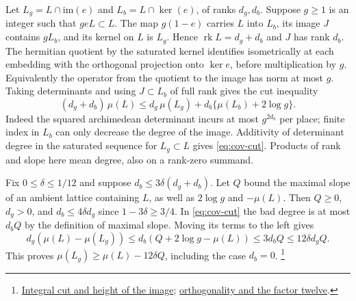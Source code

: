 Let \(L_g=L\cap\mathrm{im}(e)\) and \(L_b=L\cap\ker(e)\), of ranks
\(d_g,d_b\). Suppose \(g\ge1\) is an integer such that \(geL\subset L\).
The map \(g(1-e)\) carries \(L\) into \(L_b\), its image \(J\)
contains \(gL_b\), and its kernel on \(L\) is \(L_g\). Hence
\(\operatorname{rk}L=d_g+d_b\) and \(J\) has rank \(d_b\).
The hermitian quotient by the saturated kernel identifies isometrically
at each embedding with the orthogonal projection onto \(\ker e\),
before multiplication by \(g\). Equivalently the operator from the
quotient to the image has norm at most \(g\). Taking determinants and
using \(J\subset L_b\) of full rank gives the cut inequality
\begin{equation}
 (d_g+d_b)\,\mu(L)\le d_g\,\mu(L_g)+d_b\{\mu(L_b)+2\log g\}.
 \label{eq:cov-cut}
\end{equation}
Indeed the squared archimedean determinant incurs at most \(g^{2d_b}\)
per place; finite index in \(L_b\) can only decrease the degree of
the image. Additivity of determinant degree in the saturated sequence
for \(L_g\subset L\) gives \eqref{eq:cov-cut}. Products of rank and
slope here mean degree, also on a rank-zero summand.

Fix \(0\le\delta\le1/12\) and suppose \(d_b\le3\delta(d_g+d_b)\).
Let \(Q\) bound the maximal slope of an ambient lattice containing \(L\),
as well as \(2\log g\) and \(-\mu(L)\). Then \(Q\ge0\),
\(d_g>0\), and \(d_b\le4\delta d_g\) since \(1-3\delta\ge3/4\).
In \eqref{eq:cov-cut} the bad degree is at most \(d_bQ\) by the
definition of maximal slope. Moving its terms to the left gives
\[
 d_g(\mu(L)-\mu(L_g))\le d_b(Q+2\log g-\mu(L))
                 \le 3d_b Q\le12\delta d_gQ .
\]
This proves \(\mu(L_g)\ge\mu(L)-12\delta Q\), including the case \(d_b=0\).
\footnote{\href{https://github.com/Deicyde/riemann-hypothesis/blob/40e56bab/src/Formalism/MeanHeightDescent/AverageDegreeBounds/GoodBadCut.lean}{Integral cut and height of the image};
\href{https://github.com/Deicyde/riemann-hypothesis/blob/40e56bab/src/Development/AbelianVarietyTheory/Proofs/DivisorProofs/MajAtAddRight.lean}{orthogonality and the factor twelve}.}

